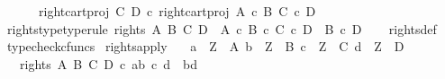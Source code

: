 \begin{isabellebody}
\ \ \ \ \ \ right{\isacharunderscore}{\kern0pt}cart{\isacharunderscore}{\kern0pt}proj\ C\ D\ {\isasymcirc}\isactrlsub c\ right{\isacharunderscore}{\kern0pt}cart{\isacharunderscore}{\kern0pt}proj\ {\isacharparenleft}{\kern0pt}A\ {\isasymtimes}\isactrlsub c\ B{\isacharparenright}{\kern0pt}\ {\isacharparenleft}{\kern0pt}C\ {\isasymtimes}\isactrlsub c\ D{\isacharparenright}{\kern0pt}\isanewline
\ \ \ \ {\isasymrangle}{\isachardoublequoteclose}\isanewline
\isanewline
{}\isamarkupfalse%
\ rights{\isacharunderscore}{\kern0pt}type{\isacharbrackleft}{\kern0pt}type{\isacharunderscore}{\kern0pt}rule{\isacharbrackright}{\kern0pt}{\isacharcolon}{\kern0pt}\ {\isachardoublequoteopen}rights\ A\ B\ C\ D\ {\isacharcolon}{\kern0pt}\ {\isacharparenleft}{\kern0pt}A\ {\isasymtimes}\isactrlsub c\ B{\isacharparenright}{\kern0pt}\ {\isasymtimes}\isactrlsub c\ {\isacharparenleft}{\kern0pt}C\ {\isasymtimes}\isactrlsub c\ D{\isacharparenright}{\kern0pt}\ {\isasymrightarrow}\ {\isacharparenleft}{\kern0pt}B\ {\isasymtimes}\isactrlsub c\ D{\isacharparenright}{\kern0pt}{\isachardoublequoteclose}\isanewline
%
\isadelimproof
\ \ %
\endisadelimproof
%
\isatagproof
{}\isamarkupfalse%
\ rights{\isacharunderscore}{\kern0pt}def\ \isamarkupfalse%
\ typecheck{\isacharunderscore}{\kern0pt}cfuncs%
\endisatagproof
{\isafoldproof}%
%
\isadelimproof
\isanewline
%
\endisadelimproof
\isanewline
{}\isamarkupfalse%
\ rights{\isacharunderscore}{\kern0pt}apply{\isacharcolon}{\kern0pt}\isanewline
\ \ \ {\isachardoublequoteopen}a\ {\isacharcolon}{\kern0pt}\ Z\ {\isasymrightarrow}\ A{\isachardoublequoteclose}\ {\isachardoublequoteopen}b\ {\isacharcolon}{\kern0pt}\ Z\ {\isasymrightarrow}\ B{\isachardoublequoteclose}\ {\isachardoublequoteopen}c\ {\isacharcolon}{\kern0pt}\ Z\ {\isasymrightarrow}\ C{\isachardoublequoteclose}\ {\isachardoublequoteopen}d\ {\isacharcolon}{\kern0pt}\ Z\ {\isasymrightarrow}\ D{\isachardoublequoteclose}\isanewline
\ \ \ {\isachardoublequoteopen}rights\ A\ B\ C\ D\ {\isasymcirc}\isactrlsub c\ {\isasymlangle}{\isasymlangle}a{\isacharcomma}{\kern0pt}b{\isasymrangle}{\isacharcomma}{\kern0pt}\ {\isasymlangle}c{\isacharcomma}{\kern0pt}\ d{\isasymrangle}{\isasymrangle}\ {\isacharequal}{\kern0pt}\ {\isasymlangle}b{\isacharcomma}{\kern0pt}d{\isasymrangle}{\isachardoublequoteclose}\isanewline
%
\isadelimproof
%
\endisadelimproof
%
\isatagproof
{}\isamarkupfalse%
\ {\isacharminus}{\kern0pt}\isanewline
\ \ \isamarkupfalse%

\end{isabellebody}
